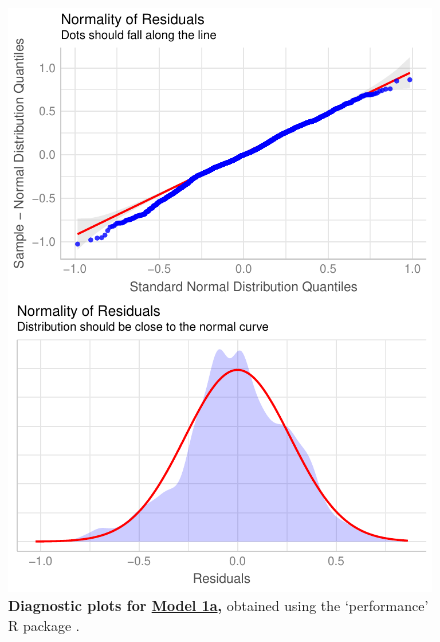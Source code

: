 \begin{figure}[h!]
\centering
\includegraphics[scale=0.7]{Supporting/Chapter3/Figures/Diagnostics/SI_diagnostics_Model1a}
\caption[Diagnostic plots for Model 1a]{\textbf{Diagnostic plots for \underline{Model 1a},} obtained using the `performance' R package \citep{performance}.}
\label{}
\end{figure}

\newpage

